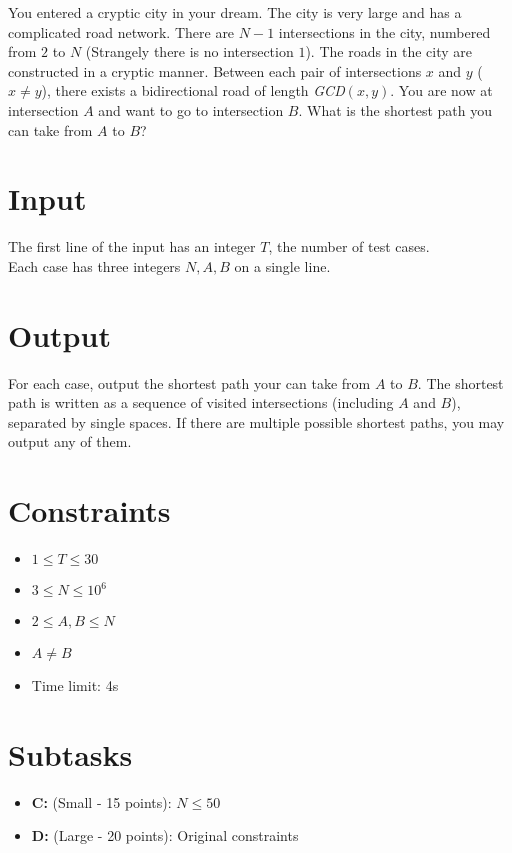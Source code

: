 
You entered a cryptic city in your dream.
The city is very large and has a complicated road network.
There are $N - 1$ intersections in the city, numbered from $2$ to $N$ (Strangely there is no intersection $1$).
The roads in the city are constructed in a cryptic manner.
Between each pair of intersections $x$ and $y$ ($x \neq y$), there exists a bidirectional road of length {\it GCD}$(x, y)$.
You are now at intersection $A$ and want to go to intersection $B$.
What is the shortest path you can take from $A$ to $B$?

\section*{Input}

The first line of the input has an integer $T$, the number of test cases.\\
Each case has three integers $N, A, B$ on a single line.

\section*{Output}

For each case, output the shortest path your can take from $A$ to $B$. The shortest path is written as a sequence of visited intersections (including $A$ and $B$), separated by single spaces. If there are multiple possible shortest paths, you may output any of them.

\section*{Constraints}
\begin{itemize}
\item $1 \leq T\leq 30$
\item $3 \leq N \leq 10^6$
\item $2 \leq A, B \leq N$
\item $A \neq B$
\item Time limit: 4s
\end{itemize}

\section*{Subtasks}
\begin{itemize}
  \item {\bf C:} (Small - 15 points): $N \leq 50$
  \item {\bf D:} (Large - 20 points): Original constraints
\end{itemize}

